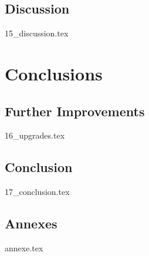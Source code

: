 \documentclass[a4paper, 12pt, titlepage, oneside]{report}
\begin{document}
\chapter{Discussion}
{15_discussion.tex}
\newpage

\part{Conclusions}
\chapter{Further Improvements}\label{upgrades}
{16_upgrades.tex}
\newpage

\chapter{Conclusion}
{17_conclusion.tex}
\newpage

\chapter*{Annexes}
{annexe.tex}
\newpage

\printglossary[title=Acronymes,type=\acronymtype]
\newpage 
\printglossary
\newpage 

\printbibliography[heading=bibintoc]
\end{document}
